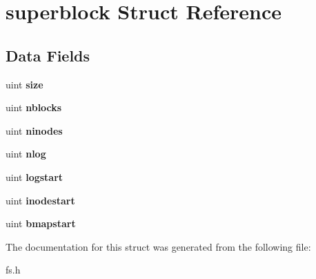 \hypertarget{structsuperblock}{}\section{superblock Struct Reference}
\label{structsuperblock}
\subsection*{Data Fields}
\begin{DoxyCompactItemize}
\item 
\mbox{\label{structsuperblock_a7c6e4d6da139ecee74eb7816d5d44fa6}} 
uint {\bfseries size}
\item 
\mbox{\label{structsuperblock_a2a27a7cfb54689f0e1dcd1788d049218}} 
uint {\bfseries nblocks}
\item 
\mbox{\label{structsuperblock_a355d2a1ebdc51f80820c23e69363cf42}} 
uint {\bfseries ninodes}
\item 
\mbox{\label{structsuperblock_aea92ae872785fd4fb39b903d9157aac5}} 
uint {\bfseries nlog}
\item 
\mbox{\label{structsuperblock_a460268b28aced19797e8d7b84aa60ebf}} 
uint {\bfseries logstart}
\item 
\mbox{\label{structsuperblock_adde361528f3905445974301b424611c1}} 
uint {\bfseries inodestart}
\item 
\mbox{\label{structsuperblock_a3c815dda5be6bda609389e76434171cc}} 
uint {\bfseries bmapstart}
\end{DoxyCompactItemize}


The documentation for this struct was generated from the following file\+:\begin{DoxyCompactItemize}
\item 
fs.\+h\end{DoxyCompactItemize}

